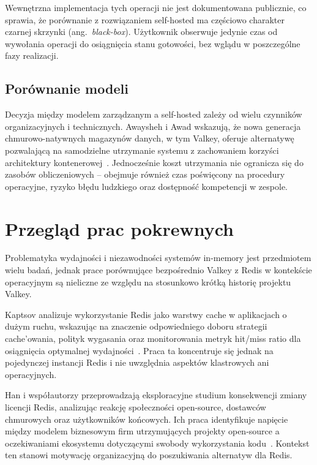 Wewnętrzna implementacja tych operacji nie jest dokumentowana publicznie, co sprawia, że porównanie z rozwiązaniem self-hosted ma częściowo charakter czarnej skrzynki (ang.~\textit{black-box}). Użytkownik obserwuje jedynie czas od wywołania operacji do osiągnięcia stanu gotowości, bez wglądu w poszczególne fazy realizacji.

\subsection{Porównanie modeli}

Decyzja między modelem zarządzanym a self-hosted zależy od wielu czynników organizacyjnych i technicznych. Awaysheh i Awad wskazują, że nowa generacja chmurowo-natywnych magazynów danych, w tym Valkey, oferuje alternatywę pozwalającą na samodzielne utrzymanie systemu z zachowaniem korzyści architektury kontenerowej~\cite{awaysheh2025}. Jednocześnie koszt utrzymania nie ogranicza się do zasobów obliczeniowych -- obejmuje również czas poświęcony na procedury operacyjne, ryzyko błędu ludzkiego oraz dostępność kompetencji w zespole.

\section{Przegląd prac pokrewnych}\label{sec:prace_pokrewne}

Problematyka wydajności i niezawodności systemów in-memory jest przedmiotem wielu badań, jednak prace porównujące bezpośrednio Valkey z Redis w kontekście operacyjnym są nieliczne ze względu na stosunkowo krótką historię projektu Valkey.

Kaptsov analizuje wykorzystanie Redis jako warstwy cache w aplikacjach o dużym ruchu, wskazując na znaczenie odpowiedniego doboru strategii cache'owania, polityk wygasania oraz monitorowania metryk hit/miss ratio dla osiągnięcia optymalnej wydajności~\cite{kaptosv2025}. Praca ta koncentruje się jednak na pojedynczej instancji Redis i nie uwzględnia aspektów klastrowych ani operacyjnych.

Han i współautorzy przeprowadzają eksploracyjne studium konsekwencji zmiany licencji Redis, analizując reakcję społeczności open-source, dostawców chmurowych oraz użytkowników końcowych. Ich praca identyfikuje napięcie między modelem biznesowym firm utrzymujących projekty open-source a oczekiwaniami ekosystemu dotyczącymi swobody wykorzystania kodu~\cite{han2026}. Kontekst ten stanowi motywację organizacyjną do poszukiwania alternatyw dla Redis.

